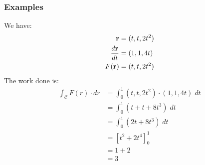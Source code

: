 \documentclass[a4paper, 10pt]{article}
\begin{document}
\pagebreak
\subsubsection{Examples}
\begin{examplebox}[: For a time period $0 \leq t \leq 1$, a particle moves along a trajectory defined by $\mathcal{C} = x = t, y = t, z = 2t^2$, a force $F(r) = (y,x,z)$ acts. Calculate work done.]
  We have:
  \begin{align*}
    \mathbf{r}           & = (t,t,2t^2) \\
    \frac{d\mathbf{r}}{dt} & = (1,1,4t)   \\
    F(\mathbf{r})        & = (t,t,2t^2)
  \end{align*}
  The work done is:
  \begin{align*}
    \int_{\mathcal{C}} F(r) \cdot dr & = \int_{0}^{1} (t,t,2t^2) \cdot (1,1,4t) \; dt \\
                                     & = \int_{0}^{1} (t + t + 8t^3) \; dt            \\
                                     & = \int_{0}^{1} (2t + 8t^3) \; dt               \\
                                     & = \left[t^2 + 2t^4\right]_0^1                  \\
                                     & = 1 + 2                                        \\
                                     & = 3
  \end{align*}
\end{examplebox}
\end{document}
